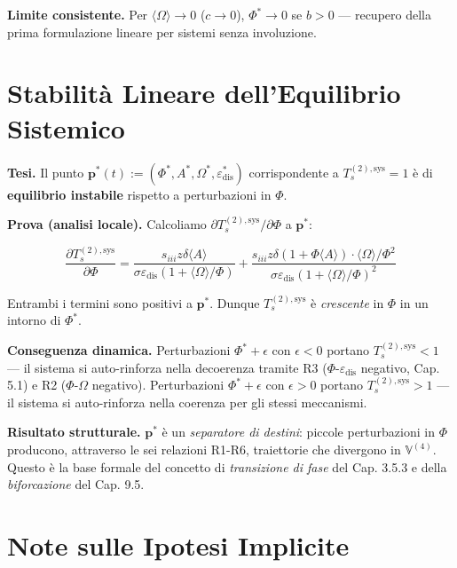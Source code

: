 \Proved{} \textbf{Limite consistente.} Per
\(\langle\Omega\rangle \to 0\) (\(c \to 0\)), \(\Phi^* \to 0\) se
\(b > 0\) --- recupero della prima formulazione lineare per sistemi
senza involuzione.



\section{Stabilità Lineare dell'Equilibrio
Sistemico}\label{stabilituxe0-lineare-dellequilibrio-sistemico}

\Hypoth{} \textbf{Tesi.} Il punto
\(\boldsymbol{p}^*(t) := (\Phi^*, A^*, \Omega^*, \varepsilon_{\text{dis}}^*)\)
corrispondente a \(T_s^{(2),\text{sys}} = 1\) è di \textbf{equilibrio
instabile} rispetto a perturbazioni in \(\Phi\).

\Proved{} \textbf{Prova (analisi locale).} Calcoliamo
\(\partial T_s^{(2),\text{sys}} / \partial \Phi\) a
\(\boldsymbol{p}^*\):

\[
\frac{\partial T_s^{(2),\text{sys}}}{\partial \Phi} = \frac{s_{iii}z\delta\langle A\rangle}{\sigma\varepsilon_{\text{dis}}(1+\langle\Omega\rangle/\Phi)} + \frac{s_{iii}z\delta(1+\Phi\langle A\rangle) \cdot \langle\Omega\rangle/\Phi^2}{\sigma\varepsilon_{\text{dis}}(1+\langle\Omega\rangle/\Phi)^2}
\]

Entrambi i termini sono positivi a \(\boldsymbol{p}^*\). Dunque
\(T_s^{(2),\text{sys}}\) è \emph{crescente} in \(\Phi\) in un intorno di
\(\Phi^*\).

\Hypoth{} \textbf{Conseguenza dinamica.} Perturbazioni
\(\Phi^* + \epsilon\) con \(\epsilon < 0\) portano
\(T_s^{(2),\text{sys}} < 1\) --- il sistema si auto-rinforza nella
decoerenza tramite R3 (\(\Phi\)-\(\varepsilon_{\text{dis}}\) negativo,
Cap. 5.1) e R2 (\(\Phi\)-\(\Omega\) negativo). Perturbazioni
\(\Phi^* + \epsilon\) con \(\epsilon > 0\) portano
\(T_s^{(2),\text{sys}} > 1\) --- il sistema si auto-rinforza nella
coerenza per gli stessi meccanismi.

\Proved{} \textbf{Risultato strutturale.} \(\boldsymbol{p}^*\) è un
\emph{separatore di destini}: piccole perturbazioni in \(\Phi\)
producono, attraverso le sei relazioni R1-R6, traiettorie che divergono
in \(\mathbb{V}^{(4)}\). Questo è la base formale del concetto di
\emph{transizione di fase} del Cap. 3.5.3 e della \emph{biforcazione}
del Cap. 9.5.



\section{Note sulle Ipotesi
Implicite}\label{note-sulle-ipotesi-implicite}

